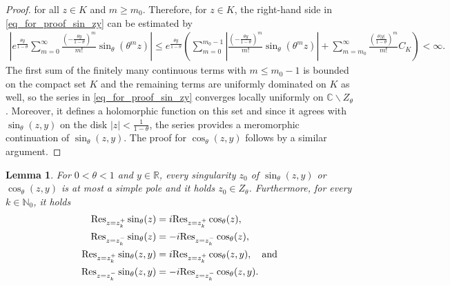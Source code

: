 \documentclass[12pt]{article}
\newcommand{\N}{\mathbb{N}} %
\newcommand{\R}{\mathbb{R}} %
\newcommand{\C}{\mathbb{C}} %
\newcommand{\1}{\mathds{1}}
\theoremstyle{definition}
\theoremstyle{plain}
\newtheorem{Lemma}[definition]{Lemma}
\theoremstyle{remark}
\begin{document}
\begin{proof}
for all $z\in K$ and $m\ge m_0$. Therefore, for $z\in K$, the right-hand side in \eqref{eq_for_proof_sin_zy} can be estimated by
\begin{align*}
    \left|e^{\frac{\theta y}{1-\theta}}\sum_{m=0}^\infty\frac{\left(-\frac{\theta y}{1-\theta}\right)^m}{m!}\sin_\theta(\theta^m z)\right|
    \!\le\! e^{\frac{\theta y}{1-\theta}}\!\left(\sum_{m=0}^{m_0-1}\left|\frac{\left(-\frac{\theta y}{1-\theta}\right)^m}{m!}\sin_\theta(\theta^m z)\right|\!+\!\!\!\sum_{m=m_0}^\infty\!\!\frac{\left(\frac{\theta |y|}{1-\theta}\right)^m}{m!}C_K\right)\!<\!\infty.
\end{align*}
The first sum of the finitely many continuous terms with $m\le m_0-1$ is bounded on the compact set $K$ and the remaining terms are uniformly dominated on $K$ as well, so the series in \eqref{eq_for_proof_sin_zy} converges locally uniformly on $\C\backslash Z_\theta$. Moreover, it defines a holomorphic function on this set and since it agrees with $ \sin_\theta(z,y)$ on the disk $|z|<\frac{1}{1-\theta}$, the series provides a meromorphic continuation of $ \sin_\theta(z,y)$.
The proof for $\cos_\theta(z,y)$ follows by a similar argument.
 \end{proof}
 \begin{Lemma}\label{residue_sin_cos_prelim}
   For $0<\theta<1$ and $y\in\R$, every singularity $z_0$ of 
   $\sin_\theta(z,y)$ or $\cos_\theta(z,y)$ is at most a simple pole and it holds $z_0\in Z_\theta$. Furthermore, for every $k\in\N_0$, it holds
   \begin{align}
   \mathrm{Res}_{z=z_k^+}\sin_\theta(z)&= i\mathrm{Res}_{z=z_k^+}\cos_\theta(z),\label{Res_sin_cos_pos}
   \\\mathrm{Res}_{z=z_k^-}\sin_\theta(z)&= -i\mathrm{Res}_{z=z_k^-}\cos_\theta(z),\label{Res_sin_cos_neg}
      \\ \mathrm{Res}_{z=z_k^+}\sin_\theta(z,y)&= i\mathrm{Res}_{z=z_k^+}\cos_\theta(z,y),\quad\text{and}\notag
       \\ \mathrm{Res}_{z=z_k^-}\sin_\theta(z,y)&=-i \mathrm{Res}_{z=z_k^-}\cos_\theta(z,y).\notag
   \end{align}
 \end{Lemma}
\end{document}
